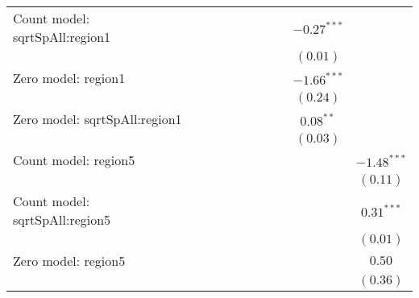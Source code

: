 \begin{table}
\begin{center}
{\begin{tabular}{l c c c c c c c c c}
Count model: sqrtSpAll:region1 &               &               &               &               &                 &                 &               & $-0.27^{***}$  &               \\
                               &               &               &               &               &                 &                 &               & $(0.01)$       &               \\
Zero model: region1            &               &               &               &               &                 &                 &               & $-1.66^{***}$  &               \\
                               &               &               &               &               &                 &                 &               & $(0.24)$       &               \\
Zero model: sqrtSpAll:region1  &               &               &               &               &                 &                 &               & $0.08^{**}$    &               \\
                               &               &               &               &               &                 &                 &               & $(0.03)$       &               \\
Count model: region5           &               &               &               &               &                 &                 &               &                & $-1.48^{***}$ \\
                               &               &               &               &               &                 &                 &               &                & $(0.11)$      \\
Count model: sqrtSpAll:region5 &               &               &               &               &                 &                 &               &                & $0.31^{***}$  \\
                               &               &               &               &               &                 &                 &               &                & $(0.01)$      \\
Zero model: region5            &               &               &               &               &                 &                 &               &                & $0.50$        \\
                               &               &               &               &               &                 &                 &               &                & $(0.36)$      \\

\end{tabular}}
\end{center}
\end{table}
